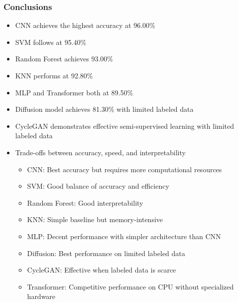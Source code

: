 \documentclass{beamer}
\begin{document}
\begin{frame}
\frametitle{Conclusions}

\begin{itemize}
    \item CNN achieves the highest accuracy at 96.00\%
    \item SVM follows at 95.40\%
    \item Random Forest achieves 93.00\%
    \item KNN performs at 92.80\%
    \item MLP and Transformer both at 89.50\%
    \item Diffusion model achieves 81.30\% with limited labeled data
    \item CycleGAN demonstrates effective semi-supervised learning with limited labeled data
    \item Trade-offs between accuracy, speed, and interpretability
    \begin{itemize}
        \item CNN: Best accuracy but requires more computational resources
        \item SVM: Good balance of accuracy and efficiency
        \item Random Forest: Good interpretability
        \item KNN: Simple baseline but memory-intensive
        \item MLP: Decent performance with simpler architecture than CNN
        \item Diffusion: Best performance on limited labeled data
        \item CycleGAN: Effective when labeled data is scarce
        \item Transformer: Competitive performance on CPU without specialized hardware
    \end{itemize}
\end{itemize}

\end{frame}
\end{document}
